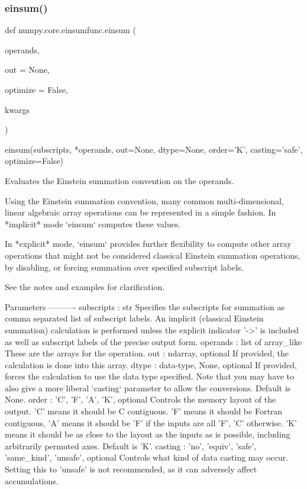 \subsubsection{\texorpdfstring{einsum()}{einsum()}}
{\footnotesize\ttfamily def numpy.\+core.\+einsumfunc.\+einsum (\begin{DoxyParamCaption}\item[{}]{operands,  }\item[{}]{out = {\ttfamily None},  }\item[{}]{optimize = {\ttfamily False},  }\item[{}]{kwargs }\end{DoxyParamCaption})}

\begin{DoxyVerb}einsum(subscripts, *operands, out=None, dtype=None, order='K',
       casting='safe', optimize=False)

Evaluates the Einstein summation convention on the operands.

Using the Einstein summation convention, many common multi-dimensional,
linear algebraic array operations can be represented in a simple fashion.
In *implicit* mode `einsum` computes these values.

In *explicit* mode, `einsum` provides further flexibility to compute
other array operations that might not be considered classical Einstein
summation operations, by disabling, or forcing summation over specified
subscript labels.

See the notes and examples for clarification.

Parameters
----------
subscripts : str
    Specifies the subscripts for summation as comma separated list of
    subscript labels. An implicit (classical Einstein summation)
    calculation is performed unless the explicit indicator '->' is
    included as well as subscript labels of the precise output form.
operands : list of array_like
    These are the arrays for the operation.
out : ndarray, optional
    If provided, the calculation is done into this array.
dtype : {data-type, None}, optional
    If provided, forces the calculation to use the data type specified.
    Note that you may have to also give a more liberal `casting`
    parameter to allow the conversions. Default is None.
order : {'C', 'F', 'A', 'K'}, optional
    Controls the memory layout of the output. 'C' means it should
    be C contiguous. 'F' means it should be Fortran contiguous,
    'A' means it should be 'F' if the inputs are all 'F', 'C' otherwise.
    'K' means it should be as close to the layout as the inputs as
    is possible, including arbitrarily permuted axes.
    Default is 'K'.
casting : {'no', 'equiv', 'safe', 'same_kind', 'unsafe'}, optional
    Controls what kind of data casting may occur.  Setting this to
    'unsafe' is not recommended, as it can adversely affect accumulations.


\end{DoxyVerb}
